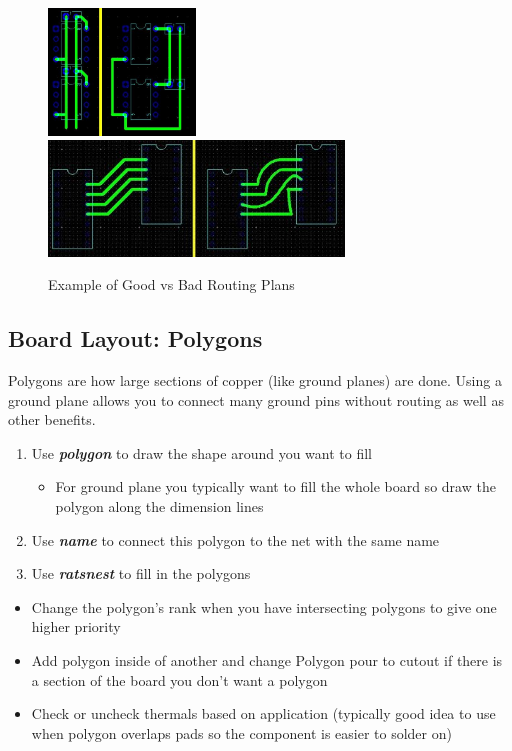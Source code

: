 \documentclass{article}
\begin{document}
\begin{figure}
    \center
    \includegraphics[width=0.35\textwidth,height=0.4\textheight,keepaspectratio]{routingvs1}
    \\
    \includegraphics[width=0.7\textwidth,height=0.6\textheight,keepaspectratio]{routingvs2}
    \caption {Example of Good vs Bad Routing Plans}
    \label{img:routing2}
\end{figure}

\subsection{Board Layout: Polygons}
Polygons are how large sections of copper (like ground planes) are done. Using a ground plane allows you to connect many ground pins without routing as well as other benefits.
\begin{enumerate}
    \item Use \textit{\textbf{polygon}} to draw the shape around you want to
    fill
    \begin{itemize}
        \item For ground plane you typically want to fill the whole board so draw the polygon along the dimension lines
    \end{itemize}
    \item Use \textit{\textbf{name}} to connect this polygon to the net with the same name
    \item Use \textit{\textbf{ratsnest}} to fill in the polygons
\end{enumerate}
\begin{tcolorbox} [title=Tips \& Tricks]
    \begin{itemize}
        \item Change the polygon's rank when you have intersecting polygons to give one higher priority
        \item Add polygon inside of another and change Polygon pour to cutout if there is a section of the board you don't want a polygon
        \item Check or uncheck thermals based on application (typically good idea to use when polygon overlaps pads so the component is easier to solder on)
    \end{itemize}
\end{tcolorbox}
\end{document}
